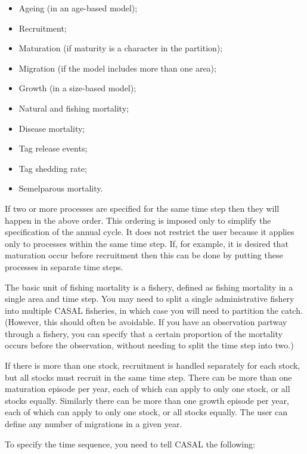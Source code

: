 \begin{itemize}
\item	Ageing (in an age-based model);
\item	Recruitment;
\item	Maturation (if maturity is a character in the partition);
\item	Migration (if the model includes more than one area);
\item	Growth (in a size-based model);
\item	Natural and fishing mortality;
\item	Disease mortality;
\item	Tag release events;
\item	Tag shedding rate;
\item	Semelparous mortality.
\end{itemize}

If two or more processes are specified for the same time step then they will happen in the above order. This ordering is imposed only to simplify the specification of the annual cycle. It does not restrict the user because it applies only to processes within the same time step. If, for example, it is desired that maturation occur before recruitment then this can be done by putting these processes in separate time steps. 

The basic unit of fishing mortality is a fishery, defined as fishing mortality in a single area and time step. You may need to split a single administrative fishery into multiple CASAL fisheries, in which case you will need to partition the catch. (However, this should often be avoidable. If you have an observation partway through a fishery, you can specify that a certain proportion of the mortality occurs before the observation, without needing to split the time step into two.) 

If there is more than one stock, recruitment is handled separately for each stock, but all stocks must recruit in the same time step. There can be more than one maturation episode per year, each of which can apply to only one stock, or all stocks equally. Similarly there can be more than one growth episode per year, each of which can apply to only one stock, or all stocks equally. The user can define any number of migrations in a given year.

To specify the time sequence, you need to tell CASAL the following: 

